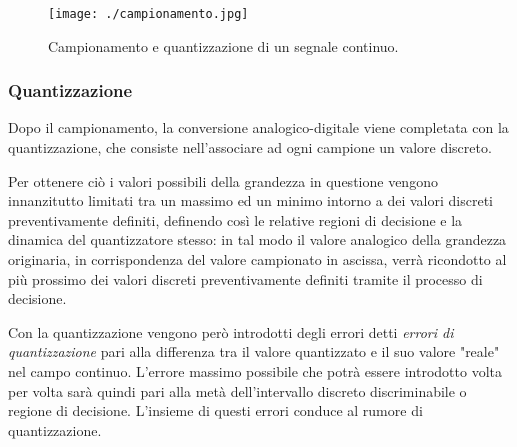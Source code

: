 \begin{figure}[h]
 \centering
 \texttt{[image: ./campionamento.jpg]}
  \label{campionamento}
\caption{Campionamento e quantizzazione di un segnale continuo.}
\end{figure}



\subsubsection{Quantizzazione}

Dopo il campionamento, la conversione analogico-digitale viene completata con la quantizzazione, che consiste nell'associare ad ogni campione un valore discreto.


Per ottenere ci\`o i valori possibili della grandezza in questione vengono innanzitutto limitati tra un massimo ed un minimo intorno a dei valori discreti preventivamente definiti, definendo cos\`i le relative regioni di decisione e la dinamica del quantizzatore stesso: in tal modo il valore analogico della grandezza originaria, 
in corrispondenza del valore campionato in ascissa, verr\`a ricondotto al pi\`u prossimo dei valori discreti preventivamente definiti tramite il processo di decisione.


Con la quantizzazione vengono per\`o introdotti degli errori detti \textit{errori di quantizzazione} pari alla differenza tra il valore quantizzato e il suo valore "reale" nel campo continuo. 
L'errore massimo possibile che potr\`a essere introdotto volta per volta sar\`a quindi pari alla met\`a dell'intervallo discreto discriminabile o regione di decisione. L'insieme di questi errori conduce al rumore di quantizzazione.


